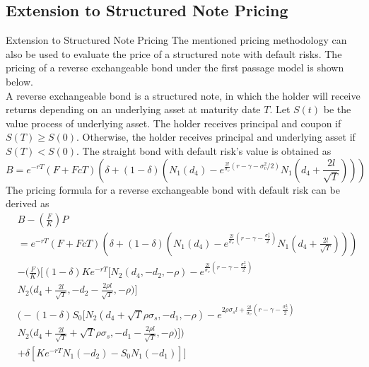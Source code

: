 \documentclass[pdf]{beamer}
\begin{document}
\subsection{Extension to Structured Note Pricing}
\begin{frame}[allowframebreaks]{Extension to Structured Note Pricing}
The mentioned pricing methodology can also be used to evaluate the price of a structured note with default risks. The pricing of a reverse exchangeable bond under the first passage model is shown below.\\
A reverse exchangeable bond is a structured note, in which the holder will receive returns depending on an underlying asset at maturity date $T$. Let $S(t)$ be the value process of underlying asset. The holder receives principal and coupon if $S(T) \geq S(0)$. Otherwise, the holder receives principal and underlying asset if $S(T) < S(0)$. 
\small
The straight bond with default risk's value is obtained as
$$
B=e^{-r T}(F+F c T)\left(\delta+(1-\delta)\left(N_{1}\left(d_{4}\right)-e^{\frac{2 l}{\sigma_{v}}\left(r-\gamma-\sigma_{v}^{2} / 2\right)} N_{1}\left(d_{4}+\frac{2 l}{\sqrt{T}}\right)\right)\right)
$$
The pricing formula for a reverse exchangeable bond with default risk can be derived as
$$
\begin{aligned}
&B-\left(\frac{F}{K}\right)P\\
&=e^{-rT}(F+FcT)\left(\delta+(1-\delta)\left(N_{1}\left(d_{4}\right)-e^{\frac{2l}{\sigma_{v}}\left(r-\gamma-\frac{\sigma_{v}^{2}}{2}\right)}N_{1}\left(d_{4}+\frac{2l}{\sqrt{T}}\right)\right)\right) \\
&-\bigg(\frac{F}{K}\bigg)\bigg[(1-\delta)Ke^{-rT}\bigg[N_{2}(d_{4},-d_{2},-\rho)-e^{\frac{2l}{\sigma_{v}}(r-\gamma-\frac{\sigma_{v}^{2}}{2})}\\
&N_{2}\bigg(d_{4}+\frac{2l}{\sqrt{T}},-d_{2}-\frac{2 \rho l}{\sqrt{T}},-\rho \bigg)\bigg]\\ 
& \bigg(-(1-\delta) S_{0}\bigg[N_{2}(d_{4}+\sqrt{T} \rho \sigma_{s},-d_{1},-\rho)-e^{2 \rho \sigma_{s} l+\frac{2 l}{\sigma_{v}}(r-\gamma-\frac{\sigma_{v}^{2}}{2})}\\
& N_{2}\bigg(d_{4}+\frac{2 l}{\sqrt{T}}+\sqrt{T} \rho \sigma_{s},-d_{1}-\frac{2 \rho l}{\sqrt{T}},-\rho \bigg)\bigg]\bigg)\\
&+ \delta [K e^{-r T} N_{1}(-d_{2}) - S_{0} N_{1}(-d_{1})]\bigg]
\end{aligned}
$$
\end{frame}
\normalsize
\end{document}
